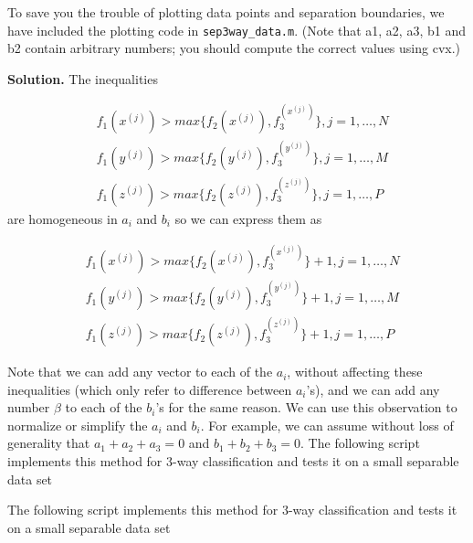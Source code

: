 \documentclass{article}
\begin{document}
To save you the trouble of plotting data points and separation boundaries, we have included the plotting code in \verb|sep3way_data.m|. (Note
that a1, a2, a3, b1 and b2 contain arbitrary numbers; you should compute the correct
values using cvx.)

{\bf Solution.} The inequalities

\begin{align*}
	&f_1(x^{(j)}) > max\{f_2(x^{(j)}), f_3^{(x^{(j)})}\}, j = 1, \dots, N 
	\\
	&f_1(y^{(j)}) > max\{f_2(y^{(j)}), f_3^{(y^{(j)})}\}, j = 1, \dots, M 
	\\
	&f_1(z^{(j)}) > max\{f_2(z^{(j)}), f_3^{(z^{(j)})}\}, j = 1, \dots, P 
\end{align*}
are homogeneous in $a_i$ and $b_i$ so we can express them as

\begin{align*}
	&f_1(x^{(j)}) > max\{f_2(x^{(j)}), f_3^{(x^{(j)})}\} + 1, j = 1, \dots, N 
	\\
	&f_1(y^{(j)}) > max\{f_2(y^{(j)}), f_3^{(y^{(j)})}\} + 1, j = 1, \dots, M 
	\\
	&f_1(z^{(j)}) > max\{f_2(z^{(j)}), f_3^{(z^{(j)})}\} + 1, j = 1, \dots, P 
\end{align*}

Note that we can add any vector to each of the $a_i$, without affecting these inequalities
(which only refer to difference between $a_i$’s), and we can add any number $\beta$ to each of
the $b_i$’s for the same reason. We can use this observation to normalize or simplify the
$a_i$ and $b_i$. For example, we can assume without loss of generality that $a_1 +a_2 +a_3 = 0$ and $b_1 + b_2 + b_3 = 0.$
The following script implements this method for 3-way classification and tests it on a
small separable data set

The following script implements this method for 3-way classification and tests it on a
small separable data set\\
\end{document}
